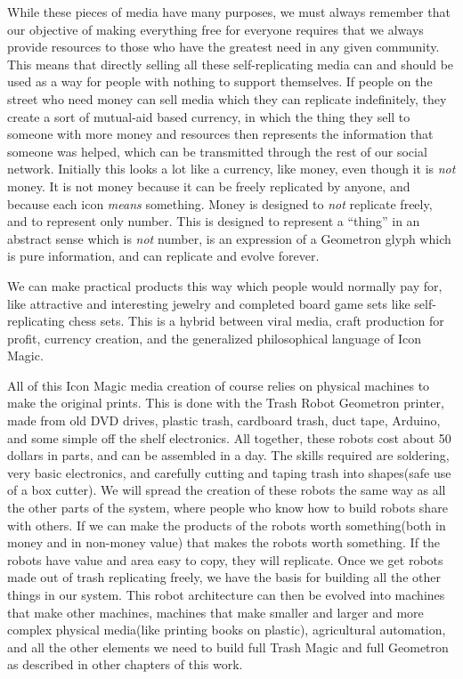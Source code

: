 While these pieces of media have many purposes, we must always remember
that our objective of making everything free for everyone requires that
we always provide resources to those who have the greatest need in any
given community. This means that directly selling all these
self-replicating media can and should be used as a way for people with
nothing to support themselves. If people on the street who need money
can sell media which they can replicate indefinitely, they create a sort
of mutual-aid based currency, in which the thing they sell to someone
with more money and resources then represents the information that
someone was helped, which can be transmitted through the rest of our
social network. Initially this looks a lot like a currency, like money,
even though it is \emph{not} money. It is not money because it can be
freely replicated by anyone, and because each icon \emph{means}
something. Money is designed to \emph{not} replicate freely, and to
represent only number. This is designed to represent a ``thing'' in an
abstract sense which is \emph{not} number, is an expression of a
Geometron glyph which is pure information, and can replicate and evolve
forever.

We can make practical products this way which people would normally pay
for, like attractive and interesting jewelry and completed board game
sets like self-replicating chess sets. This is a hybrid between viral
media, craft production for profit, currency creation, and the
generalized philosophical language of Icon Magic.

All of this Icon Magic media creation of course relies on physical
machines to make the original prints. This is done with the Trash Robot
Geometron printer, made from old DVD drives, plastic trash, cardboard
trash, duct tape, Arduino, and some simple off the shelf electronics.
All together, these robots cost about 50 dollars in parts, and can be
assembled in a day. The skills required are soldering, very basic
electronics, and carefully cutting and taping trash into shapes(safe use
of a box cutter). We will spread the creation of these robots the same
way as all the other parts of the system, where people who know how to
build robots share with others. If we can make the products of the
robots worth something(both in money and in non-money value) that makes
the robots worth something. If the robots have value and area easy to
copy, they will replicate. Once we get robots made out of trash
replicating freely, we have the basis for building all the other things
in our system. This robot architecture can then be evolved into machines
that make other machines, machines that make smaller and larger and more
complex physical media(like printing books on plastic), agricultural
automation, and all the other elements we need to build full Trash Magic
and full Geometron as described in other chapters of this work.

